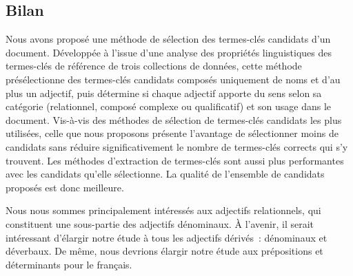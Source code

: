     \subsection{Bilan}
    \label{subsec:main:domain_independent_keyphrase_extraction-keyphrase_candidate_selection-conclusion}
      Nous avons proposé une méthode de sélection des termes-clés candidats d'un
      document. Développée à l'issue d'une analyse des propriétés linguistiques
      des termes-clés de référence de trois collections de données, cette 
      méthode présélectionne des termes-clés candidats composés uniquement de
      noms et d'au plus un adjectif, puis détermine si chaque adjectif
      apporte du sens selon sa catégorie (relationnel, composé complexe ou
      qualificatif) et son usage dans le document. Vis-à-vis des méthodes de
      sélection de termes-clés candidats les plus utilisées, celle que nous
      proposons présente l'avantage de sélectionner moins de candidats sans
      réduire significativement le nombre de termes-clés corrects qui s'y
      trouvent. Les méthodes d'extraction de termes-clés sont aussi plus
      performantes avec les candidats qu'elle sélectionne. La qualité de
      l'ensemble de candidats proposés est donc meilleure.

      Nous nous sommes principalement intéressés aux adjectifs relationnels, qui
      constituent une sous-partie des adjectifs dénominaux. À l'avenir, il
      serait intéressant d'élargir notre étude à tous les adjectifs dérivés~:
      dénominaux et déverbaux. De même, nous devrions élargir notre étude aux
      prépositions et déterminants pour le français.


